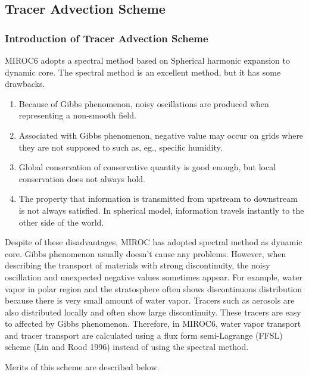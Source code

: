 \hypertarget{tracer-advection-scheme}{%
\subsection{Tracer Advection Scheme}\label{tracer-advection-scheme}}

\hypertarget{introduction-of-tracer-advection-scheme}{%
\subsubsection{Introduction of Tracer Advection Scheme}\label{introduction-of-tracer-advection-scheme}}

MIROC6 adopts a spectral method based on Spherical harmonic expansion to dynamic core. The spectral method is an excellent method, but it has some drawbacks.

\begin{enumerate}
\def\labelenumi{\arabic{enumi}.}
\item
  Because of Gibbs phenomenon, noisy oscillations are produced when representing a non-smooth field.
\item
  Associated with Gibbs phenomenon, negative value may occur on grids where they are not supposed to such as, eg., specific humidity.
\item
  Global conservation of conservative quantity is good enough, but local conservation does not always hold.
\item
  The property that information is transmitted from upstream to downstream is not always satisfied. In spherical model, information travels instantly to the other side of the world.
\end{enumerate}

Despite of these disadvantages, MIROC has adopted spectral method as dynamic core. Gibbs phenomenon usually doesn't cause any problems. However, when describing the transport of materials with strong
discontinuity, the noisy oscillation and unexpected negative values sometimes appear. For example, water vapor in polar region and the stratosphere often shows discontinuous distribution because there
is very small amount of water vapor. Tracers such as aerosols are also distributed locally and often show large discontinuity. These tracers are easy to affected by Gibbs phenomenon. Therefore, in
MIROC6, water vapor transport and tracer transport are calculated using a flux form semi-Lagrange (FFSL) scheme (Lin and Rood 1996) instead of using the spectral method.

Merits of this scheme are described below.

